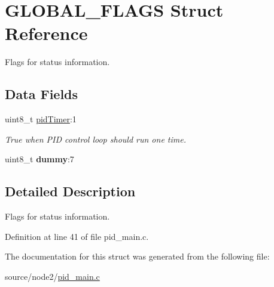 \hypertarget{struct_g_l_o_b_a_l___f_l_a_g_s}{}\section{G\+L\+O\+B\+A\+L\+\_\+\+F\+L\+A\+GS Struct Reference}
\label{struct_g_l_o_b_a_l___f_l_a_g_s}


Flags for status information.  


\subsection*{Data Fields}
\begin{DoxyCompactItemize}
\item 
\mbox{\label{struct_g_l_o_b_a_l___f_l_a_g_s_a6a87af13be5ba5f4835749cc92528a09}} 
uint8\+\_\+t \hyperlink{struct_g_l_o_b_a_l___f_l_a_g_s_a6a87af13be5ba5f4835749cc92528a09}{pid\+Timer}\+:1
\begin{DoxyCompactList}\small\item\em True when P\+ID control loop should run one time. \end{DoxyCompactList}\item 
\mbox{\label{struct_g_l_o_b_a_l___f_l_a_g_s_a4ad67e9034f614d772064cbf9088ff55}} 
uint8\+\_\+t {\bfseries dummy}\+:7
\end{DoxyCompactItemize}


\subsection{Detailed Description}
Flags for status information. 

Definition at line 41 of file pid\+\_\+main.\+c.



The documentation for this struct was generated from the following file\+:\begin{DoxyCompactItemize}
\item 
source/node2/\hyperlink{pid__main_8c}{pid\+\_\+main.\+c}\end{DoxyCompactItemize}
